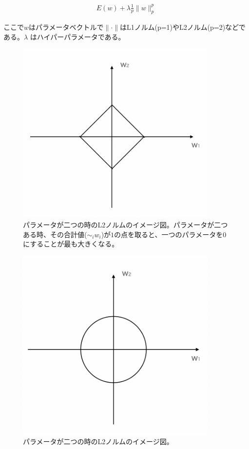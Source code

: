 \begin{eqnarray}
E(w) + \lambda \frac{1}{p}\|w\|^p_p
\label{eq:regu}
\end{eqnarray}


ここで$ w $はパラメータベクトルで$　\| \cdot \| $はL1ノルム(p=1)やL2ノルム(p=2)などである。$ \lambda $ はハイパーパラメータである。


\begin{figure}[hbtp]
    \begin{center}
        \includegraphics[width=10cm]{asset/l1norm.png}
            \caption{パラメータが二つの時のL2ノルムのイメージ図。パラメータが二つある時、その合計値($ \sim_i w_i $)が$ 1 $の点を取ると、一つのパラメータを$ 0 $にすることが最も大きくなる。}
            \label{l1norm}
    \end{center}
\end{figure}


\begin{figure}[hbtp]
    \begin{center}
        \includegraphics[width=10cm]{asset/l2norm.png}
            \caption{パラメータが二つの時のL2ノルムのイメージ図。}
            \label{l2norm}
    \end{center}
\end{figure}


